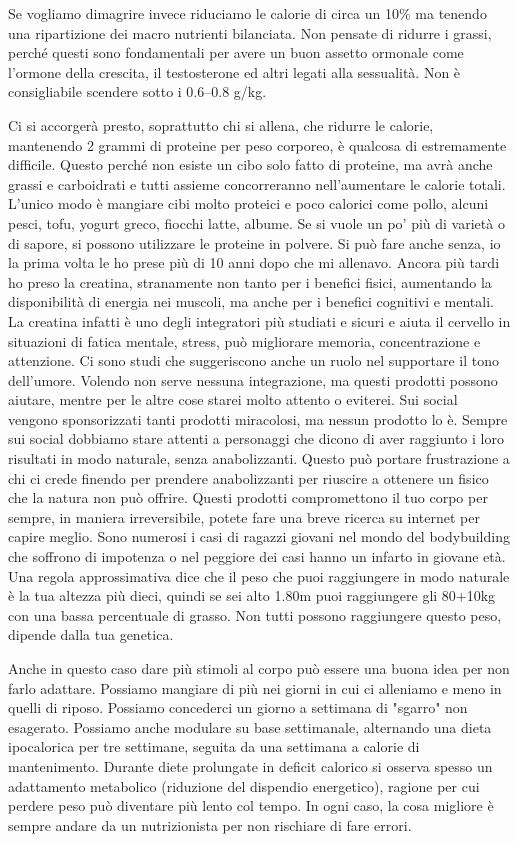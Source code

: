 \documentclass[12pt]{book} %
\begin{document}
Se vogliamo dimagrire invece riduciamo le calorie di circa un 10\% ma tenendo una ripartizione dei macro nutrienti bilanciata. Non pensate di ridurre i grassi, perché questi sono fondamentali per avere un buon assetto ormonale come l'ormone della crescita, il testosterone ed altri legati alla sessualità. Non è consigliabile scendere sotto i 0.6–0.8 g/kg.

Ci si accorgerà presto, soprattutto chi si allena, che ridurre le calorie, mantenendo 2 grammi di proteine per peso corporeo, è qualcosa di estremamente difficile. Questo perché non esiste un cibo solo fatto di proteine, ma avrà anche grassi e carboidrati e tutti assieme concorreranno nell'aumentare le calorie totali. L'unico modo è mangiare cibi molto proteici e poco calorici come pollo, alcuni pesci, tofu, yogurt greco, fiocchi latte, albume. Se si vuole un po' più di varietà o di sapore, si possono utilizzare le proteine in polvere. Si può fare anche senza, io la prima volta le ho prese più di 10 anni dopo che mi allenavo. Ancora più tardi ho preso la creatina, stranamente non tanto per i benefici fisici, aumentando la disponibilità di energia nei muscoli, ma anche per i benefici cognitivi e mentali. La creatina infatti è uno degli integratori più studiati e sicuri e aiuta il cervello in situazioni di fatica mentale, stress, può migliorare memoria, concentrazione e attenzione. Ci sono studi che suggeriscono anche un ruolo nel supportare il tono dell’umore.
Volendo non serve nessuna integrazione, ma questi prodotti possono aiutare, mentre per le altre cose starei molto attento o eviterei. Sui social vengono sponsorizzati tanti prodotti miracolosi, ma nessun prodotto lo è. Sempre sui social dobbiamo stare attenti a personaggi che dicono di aver raggiunto i loro risultati in modo naturale, senza anabolizzanti. Questo può portare frustrazione a chi ci crede finendo per prendere anabolizzanti per riuscire a ottenere un fisico che la natura non può offrire. Questi prodotti compromettono il tuo corpo per sempre, in maniera irreversibile, potete fare una breve ricerca su internet per capire meglio. Sono numerosi i casi di ragazzi giovani nel mondo del bodybuilding che soffrono di impotenza o nel peggiore dei casi hanno un infarto in giovane età. Una regola approssimativa dice che il peso che puoi raggiungere in modo naturale è la tua altezza più dieci, quindi se sei alto 1.80m puoi raggiungere gli 80+10kg con una bassa percentuale di grasso. Non tutti possono raggiungere questo peso, dipende dalla tua genetica.

Anche in questo caso dare più stimoli al corpo può essere una buona idea per non farlo adattare. Possiamo mangiare di più nei giorni in cui ci alleniamo e meno in quelli di riposo. Possiamo concederci un giorno a settimana di "sgarro" non esagerato. Possiamo anche modulare su base settimanale, alternando una dieta ipocalorica per tre settimane, seguita da una settimana a calorie di mantenimento. Durante diete prolungate in deficit calorico si osserva spesso un adattamento metabolico (riduzione del dispendio energetico), ragione per cui perdere peso può diventare più lento col tempo. In ogni caso, la cosa migliore è sempre andare da un nutrizionista per non rischiare di fare errori.
\end{document}
